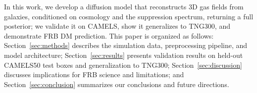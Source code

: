 \documentclass[twocolumn]{aastex631}
\begin{document}

In this work, we develop a diffusion model that reconstructs 3D gas fields from galaxies, conditioned on cosmology and the suppression spectrum, returning a full posterior; we validate it on CAMELS, show it generalizes to TNG300, and demonstrate FRB DM prediction. This paper is organized as follows: Section~\ref{sec:methods} describes the simulation data, preprocessing pipeline, and model architecture; Section~\ref{sec:results} presents validation results on held-out CAMELS50 test boxes and generalization to TNG300; Section~\ref{sec:discussion} discusses implications for FRB science and limitations; and Section~\ref{sec:conclusion} summarizes our conclusions and future directions.


\end{document}
